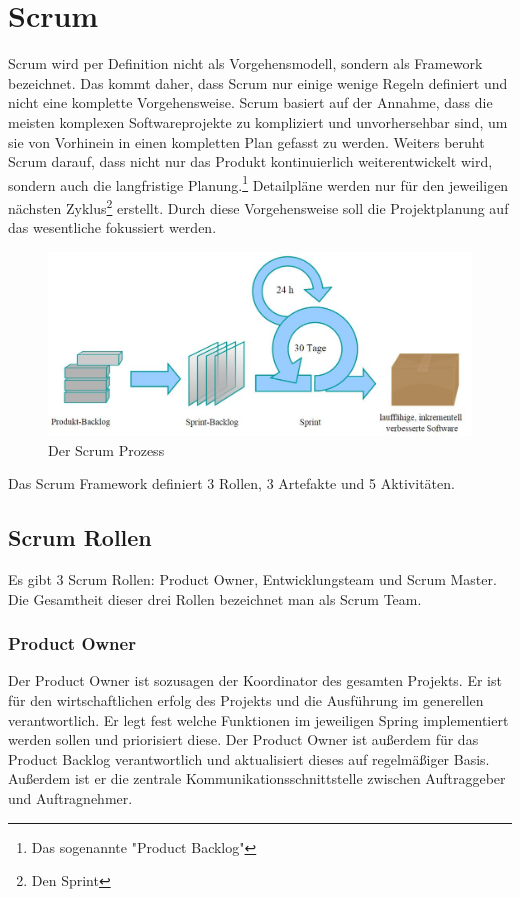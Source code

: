 \documentclass[a4paper, twopage]{scrreprt}
\begin{document}
\chapter{Scrum}
\label{ch:scrum}
Scrum wird per Definition nicht als Vorgehensmodell, sondern als Framework bezeichnet. Das kommt daher, dass Scrum nur einige wenige Regeln definiert und nicht eine komplette Vorgehensweise. Scrum basiert auf der Annahme, dass die meisten komplexen Softwareprojekte zu kompliziert und unvorhersehbar sind, um sie von Vorhinein in einen kompletten Plan gefasst zu werden. 
Weiters beruht Scrum darauf, dass nicht nur das Produkt kontinuierlich weiterentwickelt wird, sondern auch die langfristige Planung.\footnote{Das sogenannte "Product Backlog"} Detailpläne werden nur für den jeweiligen nächsten Zyklus\footnote{Den Sprint} erstellt. Durch diese Vorgehensweise soll die Projektplanung auf das wesentliche fokussiert werden.
\begin{figure}[h]
\centering
	\includegraphics[scale=0.5]{Images/scrum_prozess}
	\caption[Scrum Prozess]{Der Scrum Prozess\cite{wikipedia:scrum}}
	\label{fig:spiralmodell}
\end{figure}
Das Scrum Framework definiert 3 Rollen, 3 Artefakte und 5 Aktivitäten.

\section{Scrum Rollen}
\label{sec:scrum_rollen}
Es gibt 3 Scrum Rollen: Product Owner, Entwicklungsteam und Scrum Master. Die Gesamtheit dieser drei Rollen bezeichnet man als Scrum Team.
\subsection{Product Owner}
Der Product Owner ist sozusagen der Koordinator des gesamten Projekts. Er ist für den wirtschaftlichen erfolg des Projekts und die Ausführung im generellen verantwortlich. Er legt fest welche Funktionen im jeweiligen Spring implementiert werden sollen und priorisiert diese. Der Product Owner ist außerdem für das Product Backlog verantwortlich und aktualisiert dieses auf regelmäßiger Basis. Außerdem ist er die zentrale Kommunikationsschnittstelle zwischen Auftraggeber und Auftragnehmer.
\end{document}
